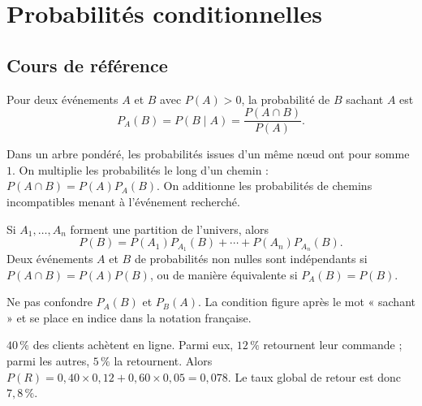 
\chapter{Probabilités conditionnelles}
\section{Cours de référence}
Pour deux événements $A$ et $B$ avec $P(A)>0$, la probabilité de $B$ sachant $A$ est
\[
P_A(B)=P(B\mid A)=\frac{P(A\cap B)}{P(A)}.
\]

\begin{center}
\end{center}

\begin{retenir}
Dans un arbre pondéré, les probabilités issues d'un même nœud ont pour somme $1$. On multiplie les probabilités le long d'un chemin : $P(A\cap B)=P(A)P_A(B)$. On additionne les probabilités de chemins incompatibles menant à l'événement recherché.
\end{retenir}

Si $A_1,\ldots,A_n$ forment une partition de l'univers, alors
\[
P(B)=P(A_1)P_{A_1}(B)+\cdots+P(A_n)P_{A_n}(B).
\]
Deux événements $A$ et $B$ de probabilités non nulles sont indépendants si $P(A\cap B)=P(A)P(B)$, ou de manière équivalente si $P_A(B)=P(B)$.

\begin{erreur}
Ne pas confondre $P_A(B)$ et $P_B(A)$. La condition figure après le mot « sachant » et se place en indice dans la notation française.
\end{erreur}

\begin{exemple}
$40\,\%$ des clients achètent en ligne. Parmi eux, $12\,\%$ retournent leur commande ; parmi les autres, $5\,\%$ la retournent. Alors $P(R)=0{,}40\times0{,}12+0{,}60\times0{,}05=0{,}078$. Le taux global de retour est donc $7{,}8\,\%$.
\end{exemple}

